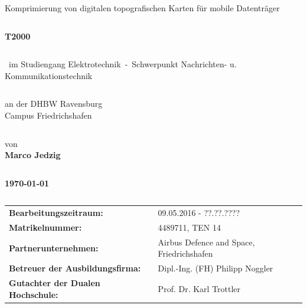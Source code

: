 \begin{center}
\LARGE{Komprimierung von digitalen topografischen Karten für mobile Datenträger}\\
\end{center}
\begin{verbatim}

\end{verbatim}
\begin{center}
\textbf{\Large{T2000}}\\
\singlespacing
\begin{verbatim}

\end{verbatim}
{~im Studiengang Elektrotechnik~-~Schwerpunkt Nachrichten- u. Kommunikationstechnik}
\end{center}
\begin{verbatim}
\end{verbatim}
\begin{center}
an der DHBW Ravensburg \\
Campus Friedrichshafen
\end{center}
\begin{verbatim}
\end{verbatim}
\begin{center}
von \\
\textbf{Marco Jedzig}
\end{center}
\begin{verbatim}

\end{verbatim}
\begin{center}
\textbf{\today}
\end{center}
\begin{verbatim}

\end{verbatim}
\begin{flushleft}
\begin{tabular}{llll}
\textbf{Bearbeitungszeitraum:} & & 09.05.2016 - ??.??.???? & \\
\textbf{Matrikelnummer:} & & 4489711, TEN 14 & \\
\textbf{Partnerunternehmen:} & & Airbus Defence and Space, Friedrichshafen & \\
\textbf{Betreuer der Ausbildungsfirma:} & & Dipl.-Ing. (FH) Philipp Noggler &\\
\textbf{Gutachter der Dualen Hochschule:} & & Prof. Dr. Karl Trottler &\\
\end{tabular}
\end{flushleft}